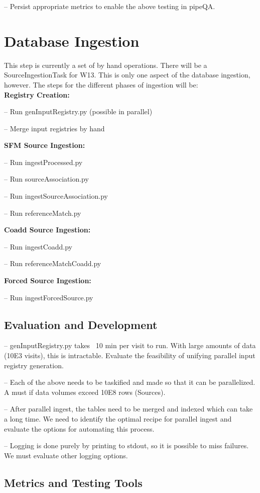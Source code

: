 \documentclass[prd, nofootinbib, floatfix, 11pt,tightenlines,times]{article}
\begin{document}
-- Persist appropriate metrics to enable the above testing in pipeQA.


\section{Database Ingestion} 
This step is currently a set of by hand operations.  
There will be a SourceIngestionTask for W13.  This is only one aspect of the
database ingestion, however.  The steps for the different phases of ingestion will be:\\
{\bf Registry Creation:}

-- Run genInputRegistry.py (possible in parallel)

-- Merge input registries by hand

{\bf SFM Source Ingestion:}

-- Run ingestProcessed.py

-- Run sourceAssociation.py

-- Run ingestSourceAssociation.py

-- Run referenceMatch.py

{\bf Coadd Source Ingestion:}

-- Run ingestCoadd.py

-- Run referenceMatchCoadd.py

{\bf Forced Source Ingestion:}

-- Run ingestForcedSource.py

\subsection{Evaluation and Development}
-- genInputRegistry.py takes ~10 min per visit to run.  With large
amounts of data (10E3 visits), this is intractable.  Evaluate the
feasibility of unifying parallel input registry generation.

-- Each of the above needs to be taskified and made so that it can be
parallelized.  A must if data volumes exceed 10E8 rows (Sources).

-- After parallel ingest, the tables need to be merged and indexed
which can take a long time.  We need to identify the optimal recipe
for parallel ingest and evaluate the options for automating this
process.

-- Logging is done purely by printing to stdout, so it is possible to
miss failures.  We must evaluate other logging options.

\subsection{Metrics and Testing Tools}
\end{document}

